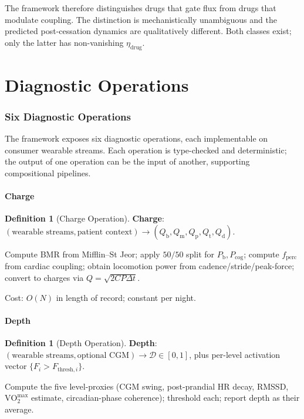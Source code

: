 \documentclass[11pt,twocolumn,a4paper]{article}
\theoremstyle{definition}
\newtheorem{definition}[theorem]{Definition}
\theoremstyle{remark}
\newcommand{\Qb}{Q_{\mathrm{b}}}
\newcommand{\Qm}{Q_{\mathrm{m}}}
\newcommand{\Qp}{Q_{\mathrm{p}}}
\newcommand{\Qt}{Q_{\mathrm{t}}}
\newcommand{\Qd}{Q_{\mathrm{d}}}
\newcommand{\Pb}{P_{\mathrm{b}}}
\newcommand{\Pcog}{P_{\mathrm{cog}}}
\newcommand{\Dhier}{\mathcal{D}}
\newcommand{\etadrug}{\eta_{\mathrm{drug}}}
\begin{document}
The framework therefore distinguishes drugs that gate flux from
drugs that modulate coupling. The distinction is mechanistically
unambiguous and the predicted post-cessation dynamics are
qualitatively different. Both classes exist; only the latter has
non-vanishing $\etadrug$.

\part{Diagnostic Operations}

\section{Six Diagnostic Operations}
\label{sec:diagnostic-primitives}

The framework exposes six diagnostic operations, each implementable on
consumer wearable streams. Each operation is type-checked and
deterministic; the output of one operation can be the input of
another, supporting compositional pipelines.

\subsection{Charge}

\begin{definition}[Charge Operation]
\textbf{Charge}: $(\text{wearable streams}, \text{patient context})
\to (\Qb, \Qm, \Qp, \Qt, \Qd)$.

Compute BMR from Mifflin--St Jeor; apply $50/50$ split for $\Pb,
\Pcog$; compute $f_{\mathrm{perc}}$ from cardiac coupling; obtain
locomotion power from cadence/stride/peak-force; convert to charges
via $Q = \sqrt{2 C P \Delta t}$.
\end{definition}

Cost: $O(N)$ in length of record; constant per night.

\subsection{Depth}

\begin{definition}[Depth Operation]
\textbf{Depth}: $(\text{wearable streams}, \text{optional CGM}) \to
\Dhier \in [0,1]$, plus per-level activation vector $\{F_i >
F_{\mathrm{thresh},i}\}$.

Compute the five level-proxies (CGM swing, post-prandial HR decay,
RMSSD, $\mathrm{VO}_2^{\max}$ estimate, circadian-phase coherence);
threshold each; report depth as their average.
\end{definition}
\end{document}
